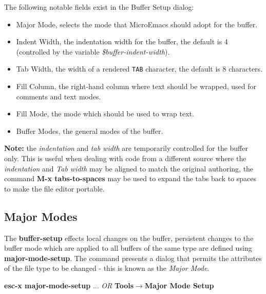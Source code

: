 \documentclass[11pt,a4paper,pdftex]{article}
\begin{document}
  The following notable fields exist in the Buffer Setup dialog:
  
  \begin{itemize}

    \item Major Mode, selects the mode that MicroEmacs should adopt for the buffer.

    \item Indent Width, the indentation width for the buffer, the default is 4
    (controlled by the variable \textit{\$buffer-indent-width}).

    \item Tab Width, the width of a rendered \texttt{TAB} character, the
    default is 8 characters.

    \item Fill Column, the right-hand column where text should be wrapped,
    used for comments and text modes.

    \item Fill Mode, the mode which should be used to wrap text.

    \item Buffer Modes, the general modes of the buffer.

  \end{itemize}
  
  \textbf{Note:} the \textit{indentation} and \textit{tab width} are
  temporarily controlled for the buffer only. This is useful when dealing with
  code from a different source where the \textit{indentation} and \textit{Tab
  width} may be aligned to match the original authoring, the command
  \textbf{M-x tabs-to-spaces} may be used to expand the tabs back to spaces to
  make the file editor portable. 

\subsection{Major Modes}    
  
  The \textbf{buffer-setup} effects local changes on the buffer, persistent
  changes to the buffer mode which are applied to all buffers of the same type
  are defined using \textbf{major-mode-setup}. The command presents a dialog
  that permits the attributes of the file type to be changed - this is known
  as the \textit{Major Mode}. 

  \textbf{esc-x major-mode-setup} $\dots$ \textit{OR}\newline
  \textbf{Tools$\rightarrow$Major Mode Setup}
\end{document}
